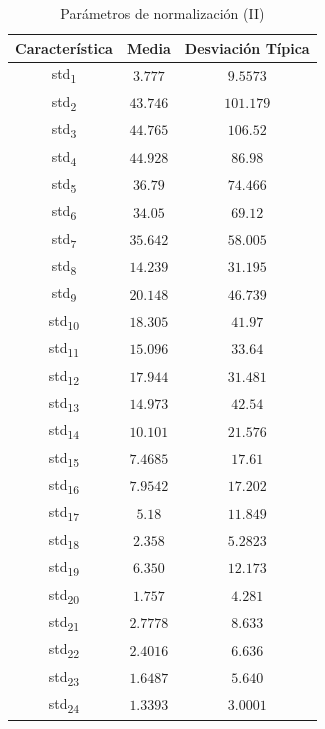 \documentclass[12pt]{article}
\begin{document}
\begin{table}
	\caption{Parámetros de normalización (II)}
	\centering
		\begin{tabular}{||c c c||}
			\hline
			Característica & Media & Desviación Típica  \\ [0.5ex]
			\hline\hline
			std\textsubscript{1} & $3.777$ & $9.5573$ \\
			\hline
			std\textsubscript{2} & $43.746$ & $101.179$ \\
			\hline
			std\textsubscript{3} & $44.765$ & $106.52$ \\
			\hline
			std\textsubscript{4} & $44.928$ & $86.98$ \\
			\hline
			std\textsubscript{5} & $36.79$ & $74.466$ \\
			\hline
			std\textsubscript{6} & $34.05$ & $69.12$ \\
			\hline
			std\textsubscript{7} & $35.642$ & $58.005$ \\
			\hline
			std\textsubscript{8} & $14.239$ & $31.195$ \\
			\hline
			std\textsubscript{9} & $20.148$ & $46.739$ \\
			\hline
			std\textsubscript{10} & $18.305$ & $41.97$ \\
			\hline
			std\textsubscript{11} & $15.096$ & $33.64$ \\
			\hline
			std\textsubscript{12} & $17.944$ & $31.481$ \\
			\hline
			std\textsubscript{13} & $14.973$ & $42.54$ \\
			\hline
			std\textsubscript{14} & $10.101$ & $21.576$ \\
			\hline
			std\textsubscript{15} & $7.4685$ & $17.61$ \\
			\hline
			std\textsubscript{16} & $7.9542$ & $17.202$ \\
			\hline
			std\textsubscript{17} & $5.18$ & $11.849$ \\
			\hline
			std\textsubscript{18} & $2.358$ & $5.2823$ \\
			\hline
			std\textsubscript{19} & $6.350$ & $12.173$ \\
			\hline
			std\textsubscript{20} & $1.757$ & $4.281$ \\
			\hline
			std\textsubscript{21} & $2.7778$ & $8.633$ \\
			\hline
			std\textsubscript{22} & $2.4016$ & $6.636$ \\
			\hline
			std\textsubscript{23} & $1.6487$ & $5.640$ \\
			\hline
			std\textsubscript{24} & $1.3393$ & $3.0001$ \\

\end{tabular}
\end{table}
\end{document}
